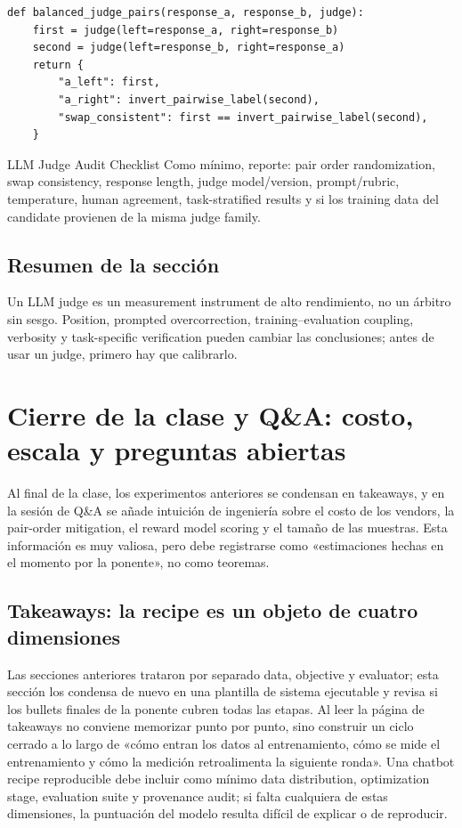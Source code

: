 \documentclass[a4paper]{article}
\begin{document}
\begin{lstlisting}[caption={Implementación conceptual de la Counterbalanced pairwise LLM-judge evaluation}]
def balanced_judge_pairs(response_a, response_b, judge):
    first = judge(left=response_a, right=response_b)
    second = judge(left=response_b, right=response_a)
    return {
        "a_left": first,
        "a_right": invert_pairwise_label(second),
        "swap_consistent": first == invert_pairwise_label(second),
    }
\end{lstlisting}

\begin{importantbox}{LLM Judge Audit Checklist}
Como mínimo, reporte: pair order randomization, swap consistency, response length, judge model/version, prompt/rubric, temperature, human agreement, task-stratified results y si los training data del candidate provienen de la misma judge family.
\end{importantbox}

\subsection{Resumen de la sección}

Un LLM judge es un measurement instrument de alto rendimiento, no un árbitro sin sesgo. Position, prompted overcorrection, training--evaluation coupling, verbosity y task-specific verification pueden cambiar las conclusiones; antes de usar un judge, primero hay que calibrarlo.
\section{Cierre de la clase y Q\&A: costo, escala y preguntas abiertas}

Al final de la clase, los experimentos anteriores se condensan en takeaways, y en la sesión de Q\&A se añade intuición de ingeniería sobre el costo de los vendors, la pair-order mitigation, el reward model scoring y el tamaño de las muestras. Esta información es muy valiosa, pero debe registrarse como «estimaciones hechas en el momento por la ponente», no como teoremas.

\subsection{Takeaways: la recipe es un objeto de cuatro dimensiones}

Las secciones anteriores trataron por separado data, objective y evaluator; esta sección los condensa de nuevo en una plantilla de sistema ejecutable y revisa si los bullets finales de la ponente cubren todas las etapas. Al leer la página de takeaways no conviene memorizar punto por punto, sino construir un ciclo cerrado a lo largo de «cómo entran los datos al entrenamiento, cómo se mide el entrenamiento y cómo la medición retroalimenta la siguiente ronda». Una chatbot recipe reproducible debe incluir como mínimo data distribution, optimization stage, evaluation suite y provenance audit; si falta cualquiera de estas dimensiones, la puntuación del modelo resulta difícil de explicar o de reproducir.
\end{document}
